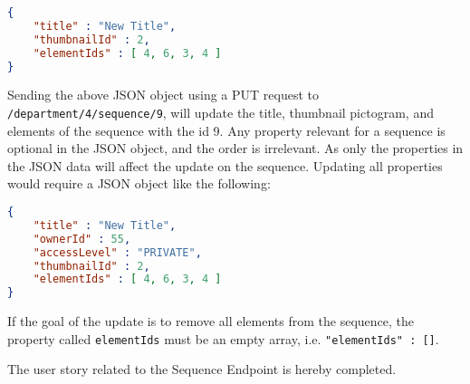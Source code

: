 \begin{lstlisting}[language=json]
{
	"title" : "New Title",
	"thumbnailId" : 2,
	"elementIds" : [ 4, 6, 3, 4 ]
}
\end{lstlisting}

Sending the above JSON object using a PUT request to \texttt{/department/4/sequence/9}, will update the title, thumbnail pictogram, and elements of the sequence with the id 9.
Any property relevant for a sequence is optional in the JSON object, and the order is irrelevant.
As only the properties in the JSON data will affect the update on the sequence.
Updating all properties would require a JSON object like the following:

\begin{lstlisting}[language=json]
{
	"title" : "New Title",
	"ownerId" : 55,
	"accessLevel" : "PRIVATE",
	"thumbnailId" : 2,
	"elementIds" : [ 4, 6, 3, 4 ]
}
\end{lstlisting}

If the goal of the update is to remove all elements from the sequence, the property called \texttt{elementIds} must be an empty array, i.e. \texttt{"elementIds" : []}.

\bigskip
The user story related to the Sequence Endpoint is hereby completed.

